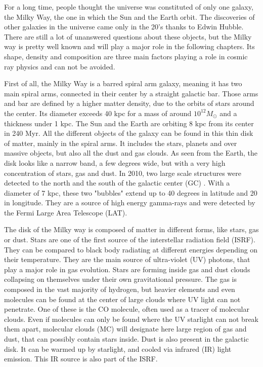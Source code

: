 For a long time, people thought the universe was constituted of only one galaxy, the Milky Way, the one in which the Sun and the Earth orbit. The discoveries of other galaxies in the universe came only in the 20's thanks to Edwin Hubble. There are still a lot of unanswered questions about these objects, but the Milky way is pretty well known and will play a major role in the following chapters. Its shape, density and composition are three main factors playing a role in cosmic ray physics and can not be avoided.

First of all, the Milky Way is a barred spiral arm galaxy, meaning it has two main spiral arms, connected in their center by a straight galactic bar. Those arms and bar are defined by a higher matter density, due to the orbits of stars around the center. Its diameter exceeds 40 kpc for a mass of around $10^{12} M_\odot$ and a thickness under 1 kpc. The Sun and the Earth are orbiting 8 kpc from its center in 240 Myr.
All the different objects of the galaxy can be found in this thin disk of matter, mainly in the spiral arms. It includes the stars, planets and over massive objects, but also all the dust and gas clouds. As seen from the Earth, the disk looks like a narrow band, a few degrees wide, but with a very high concentration of stars, gas and dust.
In 2010, two large scale structures were detected to the north and the south of the galactic center (GC) . With a diameter of 7 kpc, these two "bubbles" extend up to 40 degrees in latitude and 20 in longitude. They are a source of high energy gamma-rays and were detected by the Fermi Large Area Telescope (LAT).

The disk of the Milky way is composed of matter in different forms, like stars, gas or dust. Stars are one of the first source of the interstellar radiation field (ISRF). They can be compared to black body radiating at different energies depending on their temperature. They are the main source of ultra-violet (UV) photons, that play a major role in gas evolution. Stars are forming inside gas and dust clouds collapsing on themselves under their own gravitational pressure.
The gas is composed in the vast majority of hydrogen, but heavier elements and even molecules can be found at the center of large clouds where UV light can not penetrate. One of these is the CO molecule, often used as a tracer of molecular clouds. Even if molecules can only be found where the UV starlight can not break them apart, molecular clouds (MC) will designate here large region of gas and dust, that can possibly contain stars inside.
 Dust is also present in the galactic disk. It can be warmed up by starlight, and cooled via infrared (IR) light emission. This IR source is also part of the ISRF.

